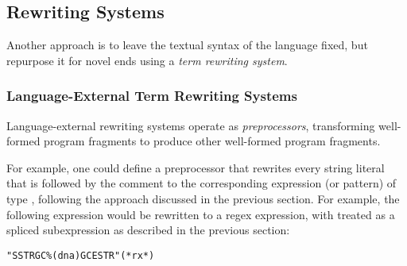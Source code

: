 {%

\subsection{Rewriting Systems}\label{sec:term-rewriting}
Another approach is to leave the textual syntax of the language fixed, but repurpose it for novel ends using a \emph{term rewriting system}.

\subsubsection{Language-External Term Rewriting Systems}
Language-external rewriting systems operate as \emph{preprocessors}, transforming well-formed program fragments to produce other well-formed program fragments.

For example, one could define a preprocessor that rewrites every string literal that is followed by the comment  to the corresponding expression (or pattern) of type , following the approach discussed in the previous section. For example, the following expression would be rewritten to a regex expression, with  treated as a spliced subexpression as described in the previous section:
\begin{lstlisting}[numbers=none]
"SSTRGC%(dna)GCESTR"(*rx*)
\end{lstlisting}

}
